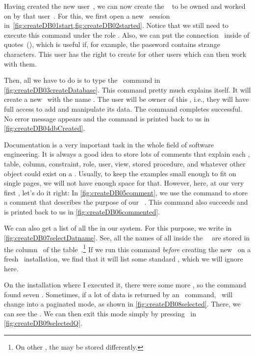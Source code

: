 %
%
%
%
Having created the new user~, we can now create the \db\  to be owned and worked on by that user~.
For this, we first open a new \psql\ session in~\cref{fig:createDB01start,fig:createDB02started}.
Notice that we still need to execute this command under the  role .
Also, we can put the connection~ inside of quotes~(), which is useful if, for example, the password contains strange characters.
This user has the right to create  for other users which can then work with them.

Then, all we have to do is to type the \sql\ command  in \cref{fig:createDB03createDatabase}.
This command pretty much explains itself.
It will create a new \db\ with the name .
The user  will be owner of this \db, i.e., they will have full access to add and manipulate its data.
The command completes successful.
No error message appears and the command is printed back to us in \cref{fig:createDB04dbCreated}.

Documentation is a very important task in the whole field of software engineering.
It is always a good idea to store lots of comments that explain each \db, table, column, constraint, role, user, view, stored procedure, and whatever other object could exist on a \dbms.
Usually, to keep the examples small enough to fit on single pages, we will not have enough space for that.
However, here, at our very first \db, let's do it right:
In \cref{fig:createDB05comment}, we use the  command to store a comment that describes the purpose of our \db\ .
This command also succeeds and is printed back to us in \cref{fig:createDB06commented}.%
%
\begin{sloppypar}%
We can also get a list of all the  in our system.
For this purpose, we write  in \cref{fig:createDB07selectDatname}.
See, all the names of all  inside the \postgresql\ \dbms\ are stored in the column~ of the table~.\footnote{%
On other , the  may be stored differently.}
If we run this command \emph{before} creating the new \db\ on a fresh \postgresql\ installation, we find that it will list some standard , which we will ignore here.%
\end{sloppypar}%
%
On the installation where I executed it, there were some more , so the command found seven .
Sometimes, if a lot of data is returned by an \sql\ command, \psql\ will change into a paginated mode, as shown in \cref{fig:createDB08selected}.
There, we can see the .
We can then exit this mode simply by pressing~ in \cref{fig:createDB09selectedQ}.

